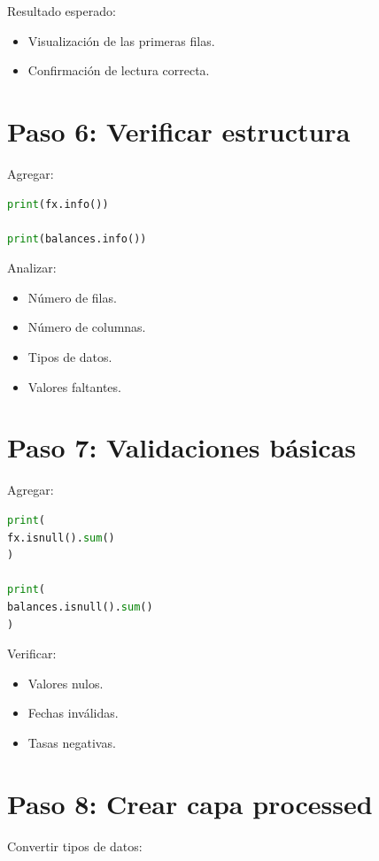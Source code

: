 Resultado esperado:

\begin{itemize}
\item Visualización de las primeras filas.
\item Confirmación de lectura correcta.
\end{itemize}

\section{Paso 6: Verificar estructura}

Agregar:

\begin{lstlisting}[language=Python]
print(fx.info())

print(balances.info())
\end{lstlisting}

Analizar:

\begin{itemize}
\item Número de filas.
\item Número de columnas.
\item Tipos de datos.
\item Valores faltantes.
\end{itemize}

\section{Paso 7: Validaciones básicas}

Agregar:

\begin{lstlisting}[language=Python]
print(
fx.isnull().sum()
)

print(
balances.isnull().sum()
)
\end{lstlisting}

Verificar:

\begin{itemize}
\item Valores nulos.
\item Fechas inválidas.
\item Tasas negativas.
\end{itemize}

\section{Paso 8: Crear capa processed}

Convertir tipos de datos:

